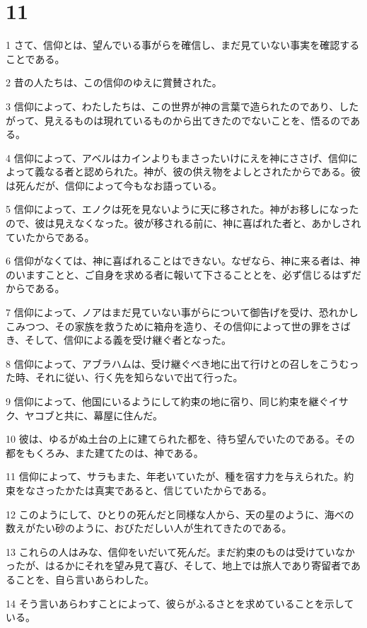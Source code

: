 \chapter{11}

\par 1 さて、信仰とは、望んでいる事がらを確信し、まだ見ていない事実を確認することである。
\par 2 昔の人たちは、この信仰のゆえに賞賛された。
\par 3 信仰によって、わたしたちは、この世界が神の言葉で造られたのであり、したがって、見えるものは現れているものから出てきたのでないことを、悟るのである。
\par 4 信仰によって、アベルはカインよりもまさったいけにえを神にささげ、信仰によって義なる者と認められた。神が、彼の供え物をよしとされたからである。彼は死んだが、信仰によって今もなお語っている。
\par 5 信仰によって、エノクは死を見ないように天に移された。神がお移しになったので、彼は見えなくなった。彼が移される前に、神に喜ばれた者と、あかしされていたからである。
\par 6 信仰がなくては、神に喜ばれることはできない。なぜなら、神に来る者は、神のいますことと、ご自身を求める者に報いて下さることとを、必ず信じるはずだからである。
\par 7 信仰によって、ノアはまだ見ていない事がらについて御告げを受け、恐れかしこみつつ、その家族を救うために箱舟を造り、その信仰によって世の罪をさばき、そして、信仰による義を受け継ぐ者となった。
\par 8 信仰によって、アブラハムは、受け継ぐべき地に出て行けとの召しをこうむった時、それに従い、行く先を知らないで出て行った。
\par 9 信仰によって、他国にいるようにして約束の地に宿り、同じ約束を継ぐイサク、ヤコブと共に、幕屋に住んだ。
\par 10 彼は、ゆるがぬ土台の上に建てられた都を、待ち望んでいたのである。その都をもくろみ、また建てたのは、神である。
\par 11 信仰によって、サラもまた、年老いていたが、種を宿す力を与えられた。約束をなさったかたは真実であると、信じていたからである。
\par 12 このようにして、ひとりの死んだと同様な人から、天の星のように、海べの数えがたい砂のように、おびただしい人が生れてきたのである。
\par 13 これらの人はみな、信仰をいだいて死んだ。まだ約束のものは受けていなかったが、はるかにそれを望み見て喜び、そして、地上では旅人であり寄留者であることを、自ら言いあらわした。
\par 14 そう言いあらわすことによって、彼らがふるさとを求めていることを示している。
